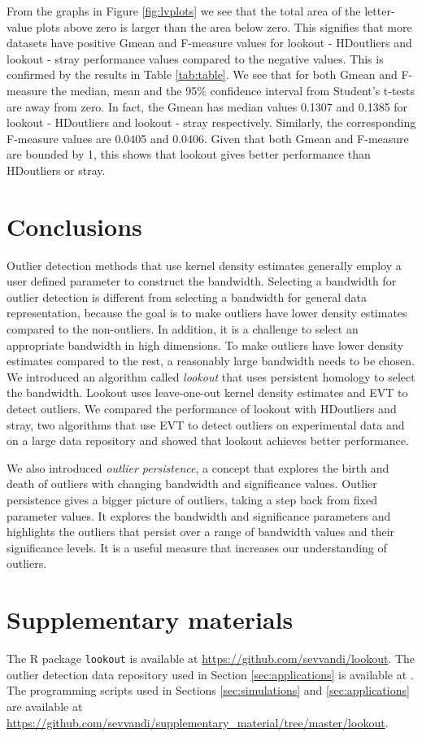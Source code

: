 \documentclass[11pt,a4paper,]{article}
\theoremstyle{definition}
\theoremstyle{definition}
\theoremstyle{definition}
\theoremstyle{remark}
\begin{document}
From the graphs in Figure \ref{fig:lvplots} we see that the total area of the letter-value plots above zero is larger than the area below zero. This signifies that more datasets have positive Gmean and F-measure values for lookout - HDoutliers and lookout - stray performance values compared to the negative values. This is confirmed by the results in Table \ref{tab:table}. We see that for both Gmean and F-measure the median, mean and the 95\% confidence interval from Student's t-tests are away from zero. In fact, the Gmean has median values 0.1307 and 0.1385 for lookout - HDoutliers and lookout - stray respectively. Similarly, the corresponding F-measure values are 0.0405 and 0.0406. Given that both Gmean and F-measure are bounded by 1, this shows that lookout gives better performance than HDoutliers or stray.

\hypertarget{sec:conclusions}{%
\section{Conclusions}\label{sec:conclusions}}

Outlier detection methods that use kernel density estimates generally employ a user defined parameter to construct the bandwidth. Selecting a bandwidth for outlier detection is different from selecting a bandwidth for general data representation, because the goal is to make outliers have lower density estimates compared to the non-outliers. In addition, it is a challenge to select an appropriate bandwidth in high dimensions. To make outliers have lower density estimates compared to the rest, a reasonably large bandwidth needs to be chosen. We introduced an algorithm called \emph{lookout} that uses persistent homology to select the bandwidth. Lookout uses leave-one-out kernel density estimates and EVT to detect outliers. We compared the performance of lookout with HDoutliers and stray, two algorithms that use EVT to detect outliers on experimental data and on a large data repository and showed that lookout achieves better performance.

We also introduced \emph{outlier persistence}, a concept that explores the birth and death of outliers with changing bandwidth and significance values. Outlier persistence gives a bigger picture of outliers, taking a step back from fixed parameter values. It explores the bandwidth and significance parameters and highlights the outliers that persist over a range of bandwidth values and their significance levels. It is a useful measure that increases our understanding of outliers.

\hypertarget{sec:suppmat}{%
\section{Supplementary materials}\label{sec:suppmat}}

The R package \texttt{lookout} is available at \url{https://github.com/sevvandi/lookout}.
The outlier detection data repository used in Section \ref{sec:applications} is available at \textcite{datasets}.
The programming scripts used in Sections \ref{sec:simulations} and \ref{sec:applications} are available at \url{https://github.com/sevvandi/supplementary_material/tree/master/lookout}.

\printbibliography
\end{document}
